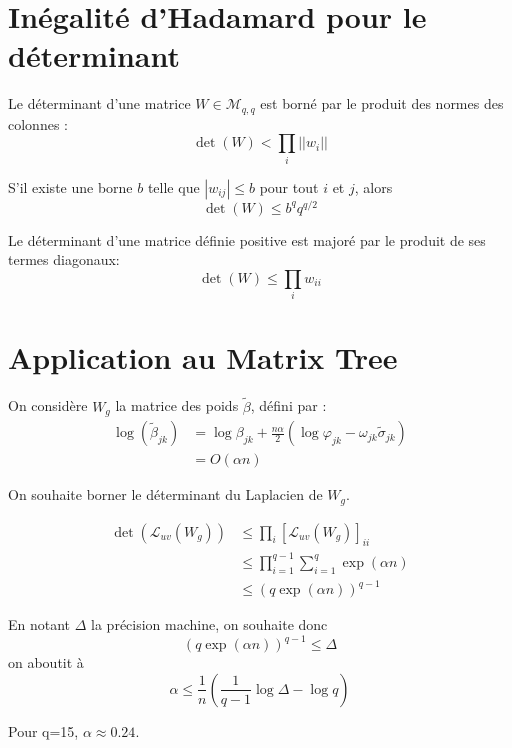 \documentclass[11pt,a4paper]{article}
\begin{document}
\section{Inégalité d'Hadamard pour le déterminant}
Le déterminant d'une matrice $W\in \mathcal{M}_{q,q}$ est borné par le produit des normes des colonnes :
$$\det(W) < \prod_i ||w_i|| $$

S'il existe une borne $b$ telle que $|w_{ij}|\leq b$ pour tout $i$ et $j$, alors
$$\det(W) \leq b^q  q^{q/2} $$

Le déterminant d'une matrice définie positive est majoré par le produit de ses termes diagonaux:
$$\det(W) \leq \prod_i w_{ii} $$

\section{Application au Matrix Tree}

On considère $W_g$ la matrice des poids $\tilde{\beta}$, défini par :
\begin{align*}
\log(\tilde{\beta}_{jk})& = \log\beta_{jk} + \frac{n\alpha}{2} (\log \varphi_{jk} - \omega_{jk} \tilde{\sigma}_{jk})\\
&= O(\alpha n)
\end{align*}

On souhaite borner le déterminant du Laplacien de $W_g$.

\begin{align*}
\det(\mathcal{L}_{uv}(W_g)) &\leq \prod_i  [\mathcal{L}_{uv}(W_g)]_{ii}\\
&\leq \prod_{i=1}^{q-1} \sum_{i=1}^q \exp(\alpha n)\\
& \leq (q \exp(\alpha n) )^{q-1}
\end{align*}

En notant $\Delta$ la précision machine, on souhaite donc 
$$(q \exp(\alpha n) )^{q-1} \leq \Delta $$
on aboutit à
$$ \alpha \leq \frac{1}{n} \left(\frac{1}{q-1} \log \Delta - \log q \right)$$

Pour q=15, $\alpha \approx 0.24$.
\end{document}
